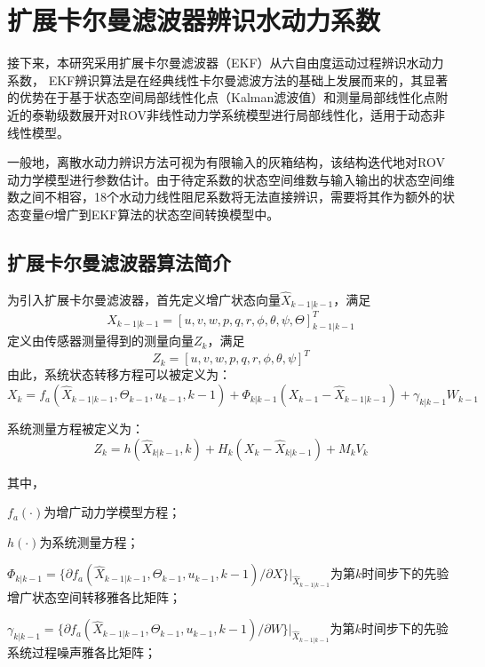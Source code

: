 \section{扩展卡尔曼滤波器辨识水动力系数}

接下来，本研究采用扩展卡尔曼滤波器（EKF）从六自由度运动过程辨识水动力系数， EKF辨识算法是在经典线性卡尔曼滤波方法的基础上发展而来的，其显著的优势在于基于状态空间局部线性化点（Kalman滤波值）和测量局部线性化点附近的泰勒级数展开对ROV非线性动力学系统模型进行局部线性化，适用于动态非线性模型。

一般地，离散水动力辨识方法可视为有限输入的灰箱结构，该结构迭代地对ROV动力学模型进行参数估计。由于待定系数的状态空间维数与输入输出的状态空间维数之间不相容，18个水动力线性阻尼系数将无法直接辨识，需要将其作为额外的状态变量$\Theta $增广到EKF算法的状态空间转换模型中。

\subsection{扩展卡尔曼滤波器算法简介}

为引入扩展卡尔曼滤波器，首先定义增广状态向量$\hat{X}_{k-1|k-1}$，满足
\begin{equation}
    \hat{X}_{k-1|k-1} = [u,v,w,p,q,r,\phi, \theta, \psi, \Theta]^T_{k-1|k-1}  
\end{equation}
定义由传感器测量得到的测量向量$Z_k$，满足
\begin{equation}
    Z_k=[u,v,w,p,q,r,\phi,\theta,\psi]^T
\end{equation}
由此，系统状态转移方程可以被定义为：
\begin{equation}
    X_k=f_a\left(\hat{X}_{k-1|k-1}, \Theta_{k-1}, u_{k-1}, k-1\right) + \Phi_{k|k-1}\left(X_{k-1}-\hat{X}_{k-1|k-1}\right) + \gamma_{k|k-1}W_{k-1}
\end{equation}

系统测量方程被定义为：
\begin{equation}
    Z_k = h\left(\hat{X}_{k|k-1},k\right)+H_k\left(X_k-\hat{X}_{k|k-1}\right)+M_kV_k
\end{equation}

其中，

$f_a(\cdot)$为增广动力学模型方程；

$h(\cdot)$为系统测量方程；

$\Phi_{k|k-1}=\{\partial f_a(\hat{X}_{k-1|k-1}, \Theta_{k-1}, u_{k-1}, k-1)/\partial X \}|_{\hat{X}_{k-1|k-1}}$为第$k$时间步下的先验增广状态空间转移雅各比矩阵；

$\gamma_{k|k-1}=\{\partial f_a(\hat{X}_{k-1|k-1}, \Theta_{k-1}, u_{k-1}, k-1)/\partial W\}|_{\hat{X}_{k-1|k-1}}$为第$k$时间步下的先验系统过程噪声雅各比矩阵；

